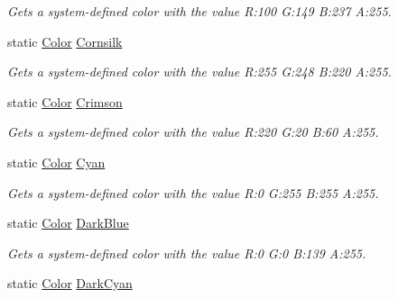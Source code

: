 \begin{DoxyCompactItemize}
\begin{DoxyCompactList}\small\item\em Gets a system-\/defined color with the value R\+:100 G\+:149 B\+:237 A\+:255.\end{DoxyCompactList}\item 
static \hyperlink{structMicrosoft_1_1Xna_1_1Framework_1_1Color}{Color} \hyperlink{structMicrosoft_1_1Xna_1_1Framework_1_1Color_a2ab29812e2c4665077e92c44baf87ea0}{Cornsilk}
\begin{DoxyCompactList}\small\item\em Gets a system-\/defined color with the value R\+:255 G\+:248 B\+:220 A\+:255.\end{DoxyCompactList}\item 
static \hyperlink{structMicrosoft_1_1Xna_1_1Framework_1_1Color}{Color} \hyperlink{structMicrosoft_1_1Xna_1_1Framework_1_1Color_aa4b9f94ce29d3647955af723a988237b}{Crimson}
\begin{DoxyCompactList}\small\item\em Gets a system-\/defined color with the value R\+:220 G\+:20 B\+:60 A\+:255.\end{DoxyCompactList}\item 
static \hyperlink{structMicrosoft_1_1Xna_1_1Framework_1_1Color}{Color} \hyperlink{structMicrosoft_1_1Xna_1_1Framework_1_1Color_a82ef18cd26a9f6281afd5fa9386ea86d}{Cyan}
\begin{DoxyCompactList}\small\item\em Gets a system-\/defined color with the value R\+:0 G\+:255 B\+:255 A\+:255.\end{DoxyCompactList}\item 
static \hyperlink{structMicrosoft_1_1Xna_1_1Framework_1_1Color}{Color} \hyperlink{structMicrosoft_1_1Xna_1_1Framework_1_1Color_a590225d19e29526848b8165fff44b7b0}{Dark\+Blue}
\begin{DoxyCompactList}\small\item\em Gets a system-\/defined color with the value R\+:0 G\+:0 B\+:139 A\+:255.\end{DoxyCompactList}\item 
static \hyperlink{structMicrosoft_1_1Xna_1_1Framework_1_1Color}{Color} \hyperlink{structMicrosoft_1_1Xna_1_1Framework_1_1Color_a5340a7e3a9c1ccbd9982a35e6439c465}{Dark\+Cyan}

\end{DoxyCompactItemize}
